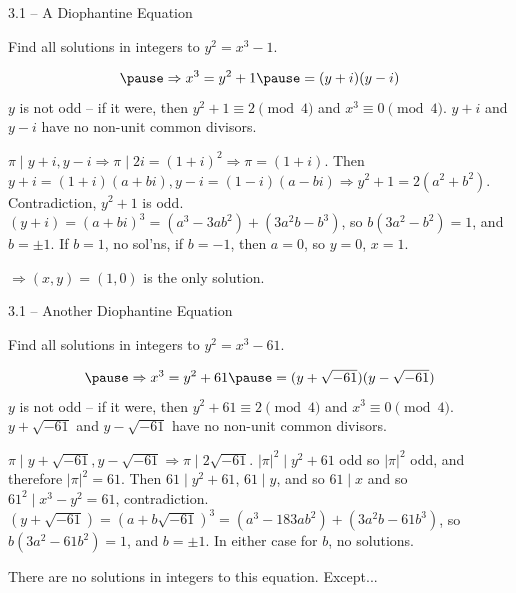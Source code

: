 \documentclass{beamer}
\theoremstyle{plain}
\begin{document}
\begin{frame}{3.1 -- A Diophantine Equation}
 \begin{problem}
   Find all solutions in integers to $y^2 = x^3 - 1$. 
 \end{problem} 
\[
\pause \Rightarrow x^3 = y^2 + 1 \pause = (y+i)(y-i) 
\]
$y$ is not odd -- if it were, then $y^2 + 1 \equiv 2 \pmod 4$ and $x^3 \equiv 0
\pmod 4$. 
\pause
\noindent{} $y+i$ and $y-i$ have no non-unit common divisors.
\pause

\noindent{} $\pi \mid y+i, y-i \Rightarrow \pi \mid 2i = (1+i)^2
\Rightarrow \pi = (1+i)$. \pause Then $y+i = (1+i)(a + bi), y-i = (1-i)(a-bi)
\Rightarrow y^2 + 1 = 2(a^2 + b^2)$. Contradiction, $y^2 + 1$ is odd.
\pause
\noindent $(y+i) = (a+bi)^3 = (a^3 - 3ab^2) + (3a^2b - b^3)$, so $b(3a^2 - b^2)
= 1$, and $b = \pm 1$. \pause If $b = 1$, no sol'ns, if $b = -1$, then $a = 0$,
so $y = 0$, $x = 1$. 

\pause $\Rightarrow (x,y) = (1, 0)$ is the only solution.
\end{frame}

\begin{frame}{3.1 -- Another Diophantine Equation}
 \begin{problem}
   Find all solutions in integers to $y^2 = x^3 - 61$. 
 \end{problem} 
\[
  \pause \Rightarrow x^3 = y^2 + 61 \pause = (y+\sqrt{-61})(y-\sqrt{-61}) 
\]
$y$ is not odd -- if it were, then $y^2 + 61 \equiv 2 \pmod 4$ and $x^3 \equiv 0
\pmod 4$. 
\pause
\noindent{} $y+\sqrt{-61}$ and $y-\sqrt{-61}$ have no non-unit common divisors.
\pause

\noindent{} $\pi \mid y+\sqrt{-61}, y-\sqrt{-61} \Rightarrow \pi \mid
2\sqrt{-61}$. \pause $|\pi|^2 \mid y^2 + 61$ odd so $|\pi|^2$ odd, and therefore $|\pi|^2 =
61$. \pause Then $61 \mid y^2 + 61$, $61 \mid y$, and so $61 \mid x$ and so
$61^2 \mid x^3 - y^2 = 61$, contradiction. 
\pause
\noindent $(y+\sqrt{-61}) = (a+b\sqrt{-61})^3 = (a^3 - 183ab^2) + (3a^2b -
61b^3)$, so $b(3a^2 - 61b^2)
= 1$, and $b = \pm 1$. \pause In either case for $b$, no solutions.  

\pause There are no solutions in integers to this equation. Except...
\end{frame}
\end{document}
